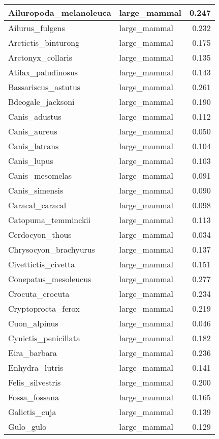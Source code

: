\begin{table}
\begin{tabular}[t]{l|l|r}
\hline
Ailuropoda\_melanoleuca & large\_mammal & 0.247\\
\hline
Ailurus\_fulgens & large\_mammal & 0.232\\
\hline
Arctictis\_binturong & large\_mammal & 0.175\\
\hline
Arctonyx\_collaris & large\_mammal & 0.135\\
\hline
Atilax\_paludinosus & large\_mammal & 0.143\\
\hline
Bassariscus\_astutus & large\_mammal & 0.261\\
\hline
Bdeogale\_jacksoni & large\_mammal & 0.190\\
\hline
Canis\_adustus & large\_mammal & 0.112\\
\hline
Canis\_aureus & large\_mammal & 0.050\\
\hline
Canis\_latrans & large\_mammal & 0.104\\
\hline
Canis\_lupus & large\_mammal & 0.103\\
\hline
Canis\_mesomelas & large\_mammal & 0.091\\
\hline
Canis\_simensis & large\_mammal & 0.090\\
\hline
Caracal\_caracal & large\_mammal & 0.098\\
\hline
Catopuma\_temminckii & large\_mammal & 0.113\\
\hline
Cerdocyon\_thous & large\_mammal & 0.034\\
\hline
Chrysocyon\_brachyurus & large\_mammal & 0.137\\
\hline
Civettictis\_civetta & large\_mammal & 0.151\\
\hline
Conepatus\_mesoleucus & large\_mammal & 0.277\\
\hline
Crocuta\_crocuta & large\_mammal & 0.234\\
\hline
Cryptoprocta\_ferox & large\_mammal & 0.219\\
\hline
Cuon\_alpinus & large\_mammal & 0.046\\
\hline
Cynictis\_penicillata & large\_mammal & 0.182\\
\hline
Eira\_barbara & large\_mammal & 0.236\\
\hline
Enhydra\_lutris & large\_mammal & 0.141\\
\hline
Felis\_silvestris & large\_mammal & 0.200\\
\hline
Fossa\_fossana & large\_mammal & 0.165\\
\hline
Galictis\_cuja & large\_mammal & 0.139\\
\hline
Gulo\_gulo & large\_mammal & 0.129\\

\end{tabular}
\end{table}
